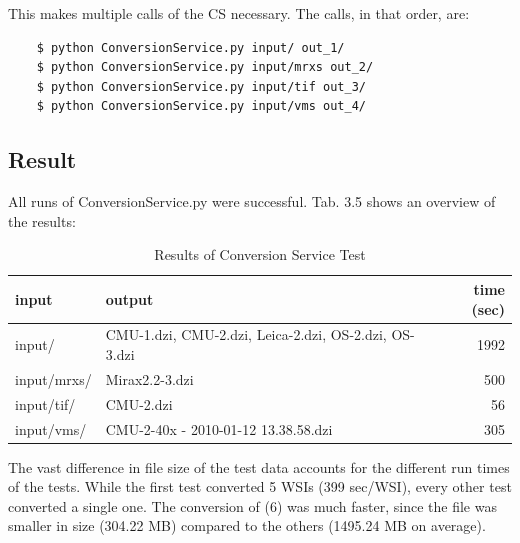 This makes multiple calls of the CS necessary. The calls, in that order, are:

\begin{lstlisting}
	$ python ConversionService.py input/ out_1/
	$ python ConversionService.py input/mrxs out_2/
	$ python ConversionService.py input/tif out_3/
	$ python ConversionService.py input/vms out_4/
\end{lstlisting}


\subsection{Result}

All runs of ConversionService.py were successful. Tab. 3.5 shows an overview of the results:

\begin{table}[H]
	\begin{center}
		\begin{tabular}{| l | l | r |}
			\hline
			\textbf{input} & \textbf{output} & \textbf{time (sec)} \\ \hline
			input/ & CMU-1.dzi, CMU-2.dzi, Leica-2.dzi, OS-2.dzi, OS-3.dzi & 1992 \\ \hline
			input/mrxs/ & Mirax2.2-3.dzi & 500 \\ \hline
			input/tif/ & CMU-2.dzi & 56 \\ \hline
			input/vms/ & CMU-2-40x - 2010-01-12 13.38.58.dzi & 305 \\ \hline
		\end{tabular}
		\caption{Results of Conversion Service Test}
	\end{center}
\end{table}

The vast difference in file size of the test data accounts for the different run times of the tests. While the first test converted 5 WSIs (399 sec/WSI), every other test converted a single one. The conversion of (6) was much faster, since the file was smaller in size (304.22 MB) compared to the others (1495.24 MB on average).